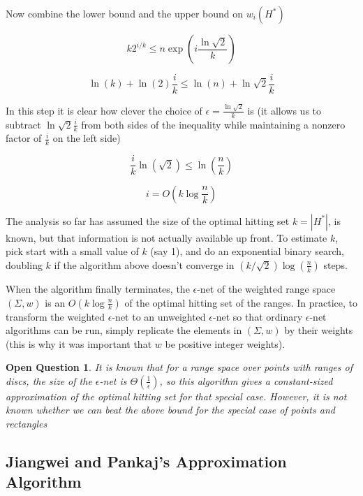 \documentclass[11pt]{article}
\newtheorem{openquestion}{Open Question}
\begin{document}
Now combine the lower bound and the upper bound on $w_i(H^*)$

\[ k 2^{i/k} \leq n \exp \left( i \frac{\ln \sqrt{2}}{k} \right) \]

\[ \ln(k) + \ln(2) \frac{i}{k} \leq \ln(n) + \ln \sqrt{2} \frac{i}{k} \]

In this step it is clear how clever the choice of $\epsilon = \frac{\ln \sqrt{2}}{k}$ is (it allows us to subtract $ \ln \sqrt{2} \frac{i}{k}$ from both sides of the inequality while maintaining a nonzero factor of $\frac{i}{k}$ on the left side)


\[ \frac{i}{k} \ln(\sqrt{2}) \leq \ln \left( \frac{n}{k} \right) \]

\[ i = O\left( k \log \frac{n}{k} \right) \]

The analysis so far has assumed the size of the optimal hitting set $k = |H^*|$, is known, but that information is not actually available up front.  To estimate $k$, pick start with a small value of $k$ (say 1), and do an exponential binary search, doubling $k$ if the algorithm above doesn't converge in $(k/\sqrt{2}) \log\left(\frac{n}{k}\right)$ steps.

When the algorithm finally terminates, the $\epsilon$-net of the weighted range space $(\Sigma, w)$ is an $O\left( k \log \frac{n}{k} \right)$ of the optimal hitting set of the ranges.  In practice, to transform the weighted $\epsilon$-net to an unweighted $\epsilon$-net so that ordinary $\epsilon$-net algorithms can be run, simply replicate the elements in $(\Sigma, w)$ by their weights (this is why it was important that $w$ be positive integer weights).


\begin{openquestion}
It is known that for a range space over points with ranges of discs, the size of the $\epsilon$-net is $\Theta(\frac{1}{\epsilon})$, so this algorithm gives a constant-sized approximation of the optimal hitting set for that special case.  However, it is not known whether we can beat the above bound for the special case of points and rectangles

\end{openquestion}

\subsection{Jiangwei and Pankaj's Approximation Algorithm}
\end{document}
